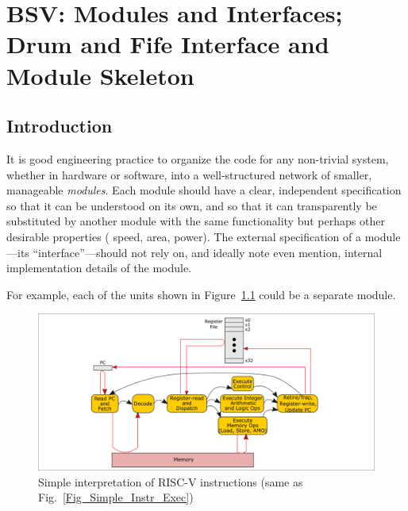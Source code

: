 

\chapter{BSV: Modules and Interfaces; \\
Drum and Fife Interface and Module Skeleton}


\setcounter{page}{1}
\renewcommand{\thepage}{\arabic{chapter}-\arabic{page}}

\label{ch_Module_Skeleton}


\section{Introduction}

It is good engineering practice to organize the code for any
non-trivial system, whether in hardware or software, into a
well-structured network of smaller, manageable \emph{modules}.  Each
module should have a clear, independent specification so that it can
be understood on its own, and so that it can transparently be
substituted by another module with the same functionality but perhaps
other desirable properties ({\eg} speed, area, power).  The external
specification of a module---its ``interface''---should not rely on,
and ideally note even mention, internal implementation details of the
module.

For example, each of the units shown in
Figure~\ref{Fig_CPU_Module_Skeleton_Simple_Instr_Exec} could be a
separate module.
\begin{figure}[htbp]
  \centerline{\includegraphics[width=6in,angle=0]{ch030_RISCV_Design_Space/Figures/Fig_Simple_Instr_Exec}}
  \caption{\label{Fig_CPU_Module_Skeleton_Simple_Instr_Exec}Simple interpretation of RISC-V instructions (same as Fig.~\ref{Fig_Simple_Instr_Exec})}
\end{figure}


